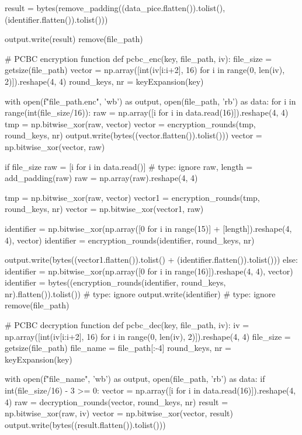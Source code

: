 \begin{python}
        result = bytes(remove_padding((data_pice.flatten()).tolist(), (identifier.flatten()).tolist()))

        output.write(result)
    remove(file_path)


# PCBC encryption function
def pcbc_enc(key, file_path, iv):
    file_size = getsize(file_path)
    vector = np.array([int(iv[i:i+2], 16) for i in range(0, len(iv), 2)]).reshape(4, 4)
    round_keys, nr = keyExpansion(key)

    with open(f"{file_path}.enc", 'wb') as output, open(file_path, 'rb') as data:
        for i in range(int(file_size/16)):
            raw = np.array([i for i in data.read(16)]).reshape(4, 4)
            tmp = np.bitwise_xor(raw, vector)
            vector = encryption_rounds(tmp, round_keys, nr)
            output.write(bytes((vector.flatten()).tolist()))
            vector = np.bitwise_xor(vector, raw)

        if file_size %
            raw = [i for i in data.read()]  # type: ignore
            raw, length = add_padding(raw)
            raw = np.array(raw).reshape(4, 4)

            tmp = np.bitwise_xor(raw, vector)
            vector1 = encryption_rounds(tmp, round_keys, nr)
            vector = np.bitwise_xor(vector1, raw)

            identifier = np.bitwise_xor(np.array([0 for i in range(15)] + [length]).reshape(4, 4), vector)
            identifier = encryption_rounds(identifier, round_keys, nr)

            output.write(bytes((vector1.flatten()).tolist() + (identifier.flatten()).tolist()))
        else:
            identifier = np.bitwise_xor(np.array([0 for i in range(16)]).reshape(4, 4), vector)
            identifier = bytes((encryption_rounds(identifier, round_keys, nr).flatten()).tolist())  # type: ignore
            output.write(identifier)  # type: ignore
    remove(file_path)


# PCBC decryption function
def pcbc_dec(key, file_path, iv):
    iv = np.array([int(iv[i:i+2], 16) for i in range(0, len(iv), 2)]).reshape(4, 4)
    file_size = getsize(file_path)
    file_name = file_path[:-4]
    round_keys, nr = keyExpansion(key)

    with open(f"{file_name}", 'wb') as output, open(file_path, 'rb') as data:
        if int(file_size/16) - 3 >= 0:
            vector = np.array([i for i in data.read(16)]).reshape(4, 4)
            raw = decryption_rounds(vector, round_keys, nr)
            result = np.bitwise_xor(raw, iv)
            vector = np.bitwise_xor(vector, result)
            output.write(bytes((result.flatten()).tolist()))


\end{python}

